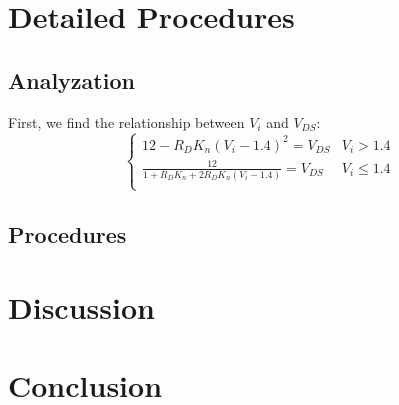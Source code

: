 \section{Detailed Procedures}
    \subsection{Analyzation}
    First, we find the relationship between $V_i$ and $V_{DS}$:
    \begin{equation}
        \begin{cases}
            12-R_DK_n(V_i-1.4)^2=V_{DS} & V_i>1.4\\
            \frac{12}{1+R_DK_n+2R_DK_n(V_i-1.4)}=V_{DS} & V_i\le1.4\\
        \end{cases}
    \end{equation}

    \subsection{Procedures}
    
    
\section{Discussion}


\section{Conclusion}
